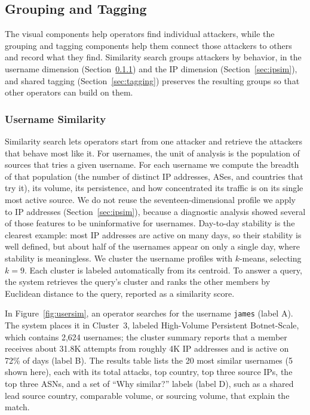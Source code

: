 \documentclass[10pt,twocolumn]{article}   %
\begin{document}
\subsection{Grouping and Tagging}
\label{sec:nonvisual}

The visual components help operators find individual attackers, while the grouping and tagging components help them connect those attackers 
to others and record what they find. Similarity search groups attackers by behavior, in the username dimension (Section~\ref{sec:usersim}) 
and the IP dimension (Section~\ref{sec:ipsim}), and shared tagging (Section~\ref{sec:tagging}) preserves the resulting groups so that other 
operators can build on them.


\subsubsection{Username Similarity}
\label{sec:usersim}


Similarity search lets operators start from one attacker and retrieve the attackers that behave most like it. For usernames, the unit of analysis is the population of 
sources that tries a given username. For each username we compute the breadth of that population (the number of distinct IP addresses, ASes, and countries that try it), 
its volume, its persistence, and how concentrated its traffic is on its single most active source. We do not reuse the seventeen-dimensional profile we apply to 
IP addresses (Section~\ref{sec:ipsim}), because a diagnostic analysis showed several of those features to be uninformative for usernames. Day-to-day stability is the 
clearest example: most IP addresses are active on many days, so their stability is well defined, but about half of the usernames appear on only a single day, where 
stability is meaningless. We cluster the username profiles with $k$-means, selecting $k=9$. Each 
cluster is labeled automatically from its centroid. To answer a query, the system retrieves the query's cluster and ranks the other members by Euclidean distance to the query, 
reported as a similarity score.
 
In Figure~\ref{fig:usersim}, an operator searches for the username \texttt{james} (label A). The system places it in Cluster~3, labeled 
High-Volume Persistent Botnet-Scale, 
which contains 2,624 usernames; the cluster summary reports that a member receives about 31.8K attempts from roughly 4K IP addresses and is active 
on 72\% of days (label B). 
The results table lists the 20 most similar usernames (5 shown here), each with its total attacks, top country, top three source IPs, 
the top three ASNs, and a set of ``Why similar?'' labels (label D), such as a 
shared lead source country, comparable volume, or sourcing volume, that explain the match.
 
\end{document}
